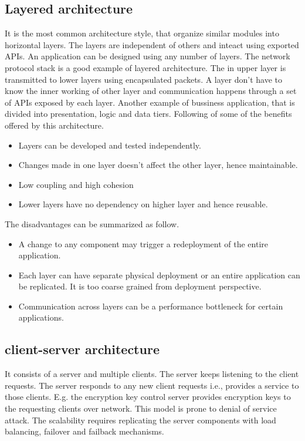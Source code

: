 \documentclass[conference]{IEEEtran}
\begin{document}
\subsection{Layered architecture}
It is the most common architecture style, that organize similar modules into horizontal layers. The layers are independent of others and inteact using exported APIs. An application can be designed using any number of layers. The network protocol stack is a good example of layered architecture. The in upper layer is transmitted to lower layers using encapsulated packets. A layer don't have to know the inner working of other layer and communication happens through a set of APIs exposed by each layer. Another example of bussiness application, that is divided into presentation, logic and data tiers. Following of some of the benefits offered by this architecture.
\begin{itemize}
\item Layers can be developed and tested independently.
\item Changes made in one layer doesn't affect the other layer, hence maintainable.
\item Low coupling and high cohesion
\item Lower layers have no dependency on higher layer and hence reusable.
\end{itemize}

The disadvantages can be summarized as follow.
\begin{itemize}
\item A change to any component may trigger a redeployment of the entire application.
\item Each layer can have separate physical deployment or an entire application can be replicated. It is too coarse grained from deployment perspective.
\item Communication across layers can be a performance bottleneck for certain applications.
\end{itemize}

\subsection{client-server architecture}
It consists of a server and multiple clients. The server keeps listening to the client requests. The server responds to any new client requests i.e., provides a service to those clients.
E.g. the encryption key control server \cite{hytrust} provides encryption keys to the requesting clients over network. This model is prone to denial of service attack. The scalability requires replicating the server components with load balancing, failover and failback mechanisms.
\end{document}
